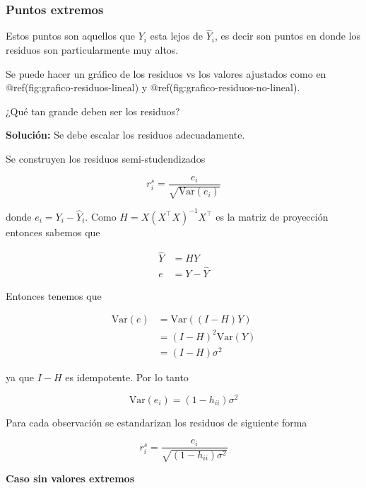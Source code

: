 \documentclass[
  12pt,
]{book}
\begin{document}
\hypertarget{puntos-extremos}{%
\subsubsection{Puntos extremos}\label{puntos-extremos}}

Estos puntos son aquellos que \(Y_i\) esta lejos de \(\hat{Y}_i\), es
decir son puntos en donde los residuos son particularmente muy altos.

Se puede hacer un gráfico de los residuos vs los valores ajustados como
en @ref(fig:grafico-residuos-lineal) y
@ref(fig:grafico-residuos-no-lineal).

¿Qué tan grande deben ser los residuos?

\textbf{Solución:} Se debe escalar los residuos adecuadamente.

Se construyen los residuos semi-studendizados

\begin{equation*}
r_{i}^{s} = \frac{e_{i}}{\sqrt{\mathrm{Var}\left(e_{i}\right)}} 
\end{equation*}

donde \(e_i=Y_i-\hat Y_i\). Como \(H=X(X^{\top}X)^{-1}X^{\top}\) es la
matriz de proyección entonces sabemos que

\begin{align*}
\hat{Y}&=  H Y \\
e &= Y - \hat{Y}  
\end{align*}

Entonces tenemos que

\begin{align*}
\mathrm{Var}\left(e\right) 
&=  \mathrm{Var}\left((I-H)Y\right)\\
&= (I-H)^{2}\mathrm{Var}\left(Y\right)\\
&= (I-H) \sigma^{2} 
\end{align*}

ya que \(I-H\) es idempotente. Por lo tanto

\begin{equation*}
\mathrm{Var}\left(e_{i}\right) = (1-h_{ii}) \sigma^{2}
\end{equation*}

Para cada observación se estandarizan los residuos de siguiente forma

\begin{equation*}
r_{i}^{s} = \frac{e_i}{\sqrt{(1-h_{ii}) \sigma^{2}}}
\end{equation*}

\textbf{Caso sin valores extremos}
\end{document}

